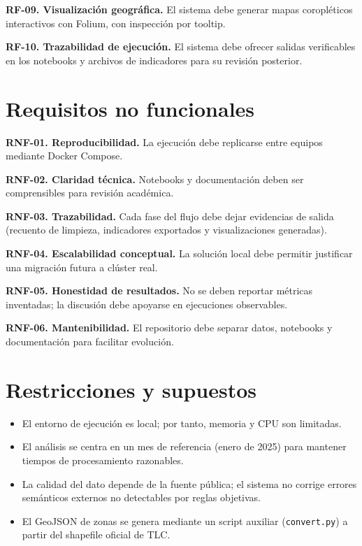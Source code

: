 \textbf{RF-09. Visualización geográfica.} El sistema debe generar mapas coropléticos
interactivos con Folium, con inspección por tooltip.

\textbf{RF-10. Trazabilidad de ejecución.} El sistema debe ofrecer salidas verificables
en los notebooks y archivos de indicadores para su revisión posterior.

\section{Requisitos no funcionales}
\textbf{RNF-01. Reproducibilidad.} La ejecución debe replicarse entre equipos mediante
Docker Compose.

\textbf{RNF-02. Claridad técnica.} Notebooks y documentación deben ser
comprensibles para revisión académica.

\textbf{RNF-03. Trazabilidad.} Cada fase del flujo debe dejar evidencias de salida
(recuento de limpieza, indicadores exportados y visualizaciones generadas).

\textbf{RNF-04. Escalabilidad conceptual.} La solución local debe permitir justificar
una migración futura a clúster real.

\textbf{RNF-05. Honestidad de resultados.} No se deben reportar métricas inventadas;
la discusión debe apoyarse en ejecuciones observables.

\textbf{RNF-06. Mantenibilidad.} El repositorio debe separar datos, notebooks y
documentación para facilitar evolución.

\section{Restricciones y supuestos}
\begin{itemize}
	\item El entorno de ejecución es local; por tanto, memoria y CPU son limitadas.
	\item El análisis se centra en un mes de referencia (enero de 2025) para
	mantener tiempos de procesamiento razonables.
	\item La calidad del dato depende de la fuente pública; el sistema no corrige
	errores semánticos externos no detectables por reglas objetivas.
	\item El GeoJSON de zonas se genera mediante un script auxiliar
	(\texttt{convert.py}) a partir del shapefile oficial de TLC.
\end{itemize}

